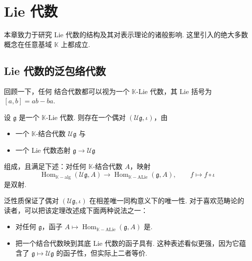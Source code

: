\chapter{Lie 代数}\label{chap:lie-2}

本章致力于研究 Lie 代数的结构及其对表示理论的诸般影响. 这里引入的绝大多数概念在任意基域 $\mathbb K$ 上都成立.

\section{Lie 代数的泛包络代数}\label{sec:lie-2-1}

回顾一下，任何 结合代数都可以视为一个 $\mathbb K$-Lie 代数，其 Lie 括号为 $[a,b]=ab-ba$.

\begin{theorem}\label{thm:lie-2-1-1}
设 $\mathfrak g$ 是一个 $\mathbb K$-Lie 代数. 则存在一个偶对 $(\mathcal U\mathfrak g,\iota)$，由
\begin{itemize}[label=--]
\item 一个 $\mathbb K$-结合代数 $\mathcal U\mathfrak g$ 与
\item 一个 Lie 代数态射 $\mathfrak g\longrightarrow\mathcal U\mathfrak g$
\end{itemize}
组成，且满足下述：对任何 $\mathbb K$-结合代数 $A$，映射
\[
\operatorname{Hom}_{\mathbb K-\mathrm{alg}}(\mathcal U\mathfrak g,A)\longrightarrow\operatorname{Hom}_{\mathbb K-\mathrm{ALie}}(\mathfrak g,A),\qquad f\mapsto f\circ\iota
\]
是双射.
\end{theorem}

泛性质保证了偶对 $(\mathcal U\mathfrak g,\iota)$ 在相差唯一同构意义下的唯一性. 对于喜欢范畴论的读者，可以把该定理改述成下面两种说法之一：
\begin{itemize}[label=--]
\item 对任何 $\mathfrak g$，函子 $A\mapsto\operatorname{Hom}_{\mathbb K-\mathrm{ALie}}(\mathfrak g,A)$ 是.
\item 把一个结合代数映到其底 Lie 代数的函子具有. 这种表述看似更强，因为它蕴含了 $\mathfrak g\mapsto\mathcal U\mathfrak g$ 的函子性，但实际上二者等价.
\end{itemize}

